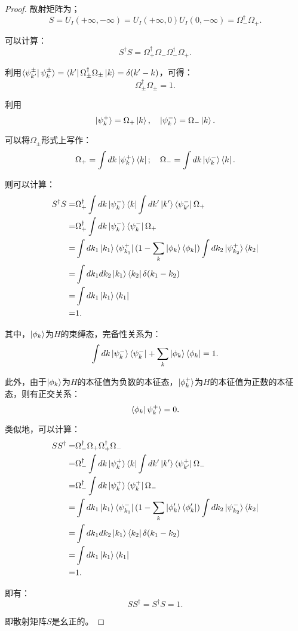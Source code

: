 \documentclass[reqno,a4paper,12pt]{amsart}
\begin{document}
\begin{proof}
散射矩阵为；
\[
	S = U_I(+\infty, -\infty) = U_I(+\infty, 0) U_I(0, -\infty) = \Omega_-^\dagger \Omega_+.
\]

可以计算：
\[
	S^\dagger S = \Omega_+^\dagger \Omega_- \Omega_-^\dagger \Omega_+.
\]

利用$\bra{\psi_{k'}^\pm} \psi_k^\pm \rangle = \bra{k'} \Omega_\pm^\dagger \Omega_\pm \ket{k} = \delta(k'-k)$，可得：
\[
	\Omega_\pm^\dagger \Omega_\pm = 1.
\]

利用
\[
	\ket{\psi_k^+} = \Omega_+ \ket{k}, \ \ \ \ket{\psi_k^-} = \Omega_-\ket{k}.
\]

可以将$\Omega_\pm$形式上写作：
\[
	\Omega_+ = \int dk \ket{\psi_k^+} \bra{k}; \ \ \ \Omega_- = \int dk \ket{\psi_k^-} \bra{k}.
\]

则可以计算：
\begin{align*}
	S^\dagger S =& \Omega_+^\dagger \int dk \ket{\psi_k^-} \bra{k} \int dk' \ket{k'} \bra{\psi_{k'}^-} \Omega_+ \\
	=& \Omega_+^\dagger \int dk \ket{\psi_k^-} \bra{\psi_k^-} \Omega_+ \\
	=& \int dk_1 \ket{k_1}\bra{\psi_{k_1}^+} (1-\sum_k \ket{\phi_k} \bra{\phi_k}) \int dk_2 \ket{\psi_{k_2}^+} \bra{k_2} \\
	=& \int dk_1 dk_2 \ket{k_1} \bra{k_2} \delta(k_1-k_2) \\
	=& \int dk_1 \ket{k_1} \bra{k_1} \\
	=& 1.
\end{align*}

其中，$\ket{\phi_k}$为$H$的束缚态，完备性关系为：
\[
	\int dk \ket{\psi_k^-} \bra{\psi_k^-} + \sum_k \ket{\phi_k} \bra{\phi_k} = 1.
\]

此外，由于$\ket{\phi_k}$为$H$的本征值为负数的本征态，$\ket{\phi_k^+}$为$H$的本征值为正数的本征态，则有正交关系：
\[
	\bra{\phi_k} \psi_{k}^+ \rangle = 0.
\]

类似地，可以计算：
\begin{align*}
	SS^\dagger =& \Omega_-^\dagger \Omega_+ \Omega_+^\dagger \Omega_- \\
	=& \Omega_-^\dagger \int dk \ket{\psi_k^+} \bra{k} \int dk' \ket{k'} \bra{\psi_{k'}^+} \Omega_- \\
	=& \Omega_-^\dagger \int dk \ket{\psi_k^+} \bra{\psi_k^+} \Omega_- \\
	=& \int dk_1 \ket{k_1} \bra{\psi_{k_1}^-} (1-\sum_{k}\ket{\phi_k'}\bra{\phi_k'}) \int dk_2 \ket{\psi_{k_2}^-} \bra{k_2} \\
	=& \int dk_1 dk_2 \ket{k_1} \bra{k_2} \delta(k_1-k_2) \\
	=& \int dk_1 \ket{k_1} \bra{k_1} \\
	=& 1.
\end{align*}

即有：
\[
	SS^\dagger = S^\dagger S = 1.
\]

即散射矩阵$S$是幺正的。
%
%
\end{proof}
\end{document}
